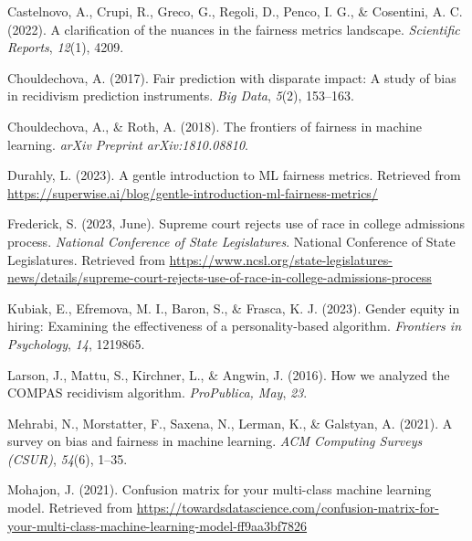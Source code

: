 \documentclass[12pt, twoside]{amherstthesis}
\newenvironment{CSLReferences}[2]%
  {}%
  {\par}
\begin{document}
\begin{CSLReferences}{1}{0}
\leavevmode{}%
Castelnovo, A., Crupi, R., Greco, G., Regoli, D., Penco, I. G., \& Cosentini, A. C. (2022). A clarification of the nuances in the fairness metrics landscape. \emph{Scientific Reports}, \emph{12}(1), 4209.

\leavevmode{}%
Chouldechova, A. (2017). Fair prediction with disparate impact: A study of bias in recidivism prediction instruments. \emph{Big Data}, \emph{5}(2), 153--163.

\leavevmode{}%
Chouldechova, A., \& Roth, A. (2018). The frontiers of fairness in machine learning. \emph{arXiv Preprint arXiv:1810.08810}.

\leavevmode{}%
Durahly, L. (2023). A gentle introduction to ML fairness metrics. Retrieved from \url{https://superwise.ai/blog/gentle-introduction-ml-fairness-metrics/}

\leavevmode{}%
Frederick, S. (2023, June). Supreme court rejects use of race in college admissions process. \emph{National Conference of State Legislatures}. National Conference of State Legislatures. Retrieved from \url{https://www.ncsl.org/state-legislatures-news/details/supreme-court-rejects-use-of-race-in-college-admissions-process}

\leavevmode{}%
Kubiak, E., Efremova, M. I., Baron, S., \& Frasca, K. J. (2023). Gender equity in hiring: Examining the effectiveness of a personality-based algorithm. \emph{Frontiers in Psychology}, \emph{14}, 1219865.

\leavevmode{}%
Larson, J., Mattu, S., Kirchner, L., \& Angwin, J. (2016). How we analyzed the COMPAS recidivism algorithm. \emph{ProPublica, May}, \emph{23}.

\leavevmode{}%
Mehrabi, N., Morstatter, F., Saxena, N., Lerman, K., \& Galstyan, A. (2021). A survey on bias and fairness in machine learning. \emph{ACM Computing Surveys (CSUR)}, \emph{54}(6), 1--35.

\leavevmode{}%
Mohajon, J. (2021). Confusion matrix for your multi-class machine learning model. Retrieved from \url{https://towardsdatascience.com/confusion-matrix-for-your-multi-class-machine-learning-model-ff9aa3bf7826}


\end{CSLReferences}
\end{document}
